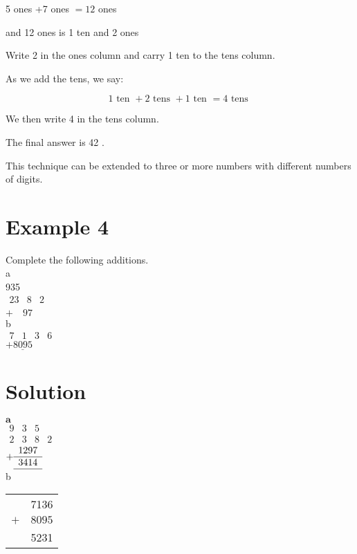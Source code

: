 \documentclass[10pt]{article}
\begin{document}
5 ones +7 ones \(=12\) ones

and 12 ones is 1 ten and 2 ones

Write 2 in the ones column and carry 1 ten to the tens column.

As we add the tens, we say:

\[
1 \text { ten }+2 \text { tens }+1 \text { ten }=4 \text { tens }
\]

We then write 4 in the tens column.

The final answer is 42 .

This technique can be extended to three or more numbers with different numbers of digits.

\section*{Example 4}
Complete the following additions.\\
a\\
935\\
\(\begin{array}{llll}23 & 8 & 2 \\ & & \end{array}\)\\
\(+\quad 97\)\\
b\\
\(\begin{array}{llll}7 & 1 & 3 & 6\end{array}\)\\
\(+\underline{8095}\)

\section*{Solution}
\(\mathbf{a}\)\\
\(\begin{array}{llll}9 & 3 & 5\end{array}\)\\
\(\begin{array}{llll}2 & 3 & 8 & 2\end{array}\)\\
\(+\begin{array}{r}1297 \\ \hline 3414 \\ \hline\end{array}\)\\
b

\begin{center}
\begin{tabular}{r}
7136 \\
\(+\quad 8095\) \\
\hline
5231 \\
\hline
\end{tabular}
\end{center}
\end{document}
